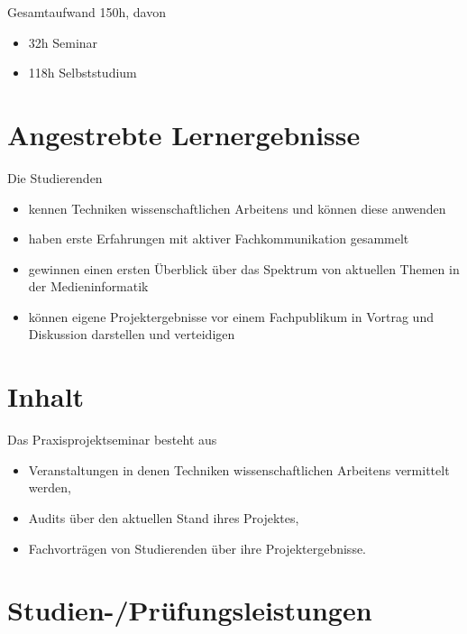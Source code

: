 Gesamtaufwand 150h, davon

\begin{itemize}
\tightlist
\item
  32h Seminar
\item
  118h Selbststudium
\end{itemize}

\section*{Angestrebte
Lernergebnisse\label{/mi-2017/modulbeschreibungen-bachelor/BA_Praxisprojektseminar}}\label{angestrebte-lernergebnissepathlabelmi-2017modulbeschreibungen-bachelorbaux5fpraxisprojektseminar}

Die Studierenden

\begin{itemize}
\tightlist
\item
  kennen Techniken wissenschaftlichen Arbeitens und können diese
  anwenden
\item
  haben erste Erfahrungen mit aktiver Fachkommunikation gesammelt
\item
  gewinnen einen ersten Überblick über das Spektrum von aktuellen Themen
  in der Medieninformatik
\item
  können eigene Projektergebnisse vor einem Fachpublikum in Vortrag und
  Diskussion darstellen und verteidigen
\end{itemize}

\section*{Inhalt\label{/mi-2017/modulbeschreibungen-bachelor/BA_Praxisprojektseminar}}\label{inhaltpathlabelmi-2017modulbeschreibungen-bachelorbaux5fpraxisprojektseminar}

Das Praxisprojektseminar besteht aus

\begin{itemize}
\tightlist
\item
  Veranstaltungen in denen Techniken wissenschaftlichen Arbeitens
  vermittelt werden,
\item
  Audits über den aktuellen Stand ihres Projektes,
\item
  Fachvorträgen von Studierenden über ihre Projektergebnisse.
\end{itemize}

\section*{Studien-/Prüfungsleistungen\label{/mi-2017/modulbeschreibungen-bachelor/BA_Praxisprojektseminar}}\label{studien-pruxfcfungsleistungenpathlabelmi-2017modulbeschreibungen-bachelorbaux5fpraxisprojektseminar}

